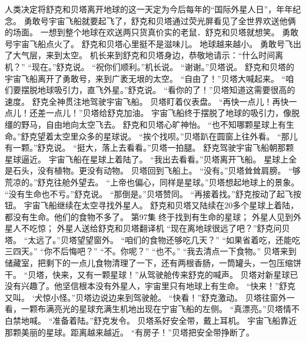 \documentclass[a4paper,12pt,UTF8,twoside]{ctexbook}
\begin{document}
        人类决定将舒克和贝塔离开地球的这一天定为今后每年的“国际外星人日”，年年纪念。 
        勇敢号宇宙飞船就要起飞了，舒克和贝塔通过荧光屏看见了全世界欢送他俩的场面。 
        一想到整个地球在欢送两只货真价实的老鼠．舒克和贝塔就想笑。 
        勇敢号宇宙飞船点火了。 
        舒克和贝塔心里挺不是滋味儿。 
        地球越来越小。 
        勇敢号飞出了大气层，来到太空。 
        机长来到舒克和贝塔身边，恭敬地请示：“什么时间离机？” 
        “现在。”舒克说。 
        “祝你们顺利。”机长说。 
        “谢谢。”贝塔说。 
        舒克和贝塔的宇宙飞船离开了勇敢号，来到广袤无垠的太空。 
       “自由了！”贝塔大喊起来。 
        “咱们要摆脱地球吸引力，直飞外星。”舒克说。 
        “看你的了！”贝塔知道这需要很高的速度。 
        舒克全神贯注地驾驶宇宙飞船。 
        贝塔盯着仪表盘。 
        “再快一点儿！再快一点儿！还差一点儿！”贝塔给舒克加油。 
        宇宙飞船终于摆脱了地球的吸引力，像脱缰的野马，自由地向太空飞去。 
        舒克和贝塔心旷神怡。 
        “也不知哪颗星球上有生命。”舒克望着太空里众多的星球说。 
        “挨个找呗。”贝塔趴在圆窗上往外看。 
        “那儿有一颗。”舒克说。 
        “挺大，落上去看看。”贝塔一拍腿。 
        舒克驾驶宇宙飞船朝那颗星球逼近。 
        宇宙飞船在星球上着陆了。 
        “我出去看看。”贝塔离开飞船。 
        星球上全是石头，没有植物。更没有动物。 
        贝塔回到飞船上。 
        “没有。”贝塔耸耸肩膀。 
        “够荒凉的。”舒克往舱外望去。 
        “上帝也偏心，同样是星球。”贝塔想起地球上的景象。 
        “没有生命也不亏。”舒克说。 
        “那倒是。”贝塔赞同。 
        “再接着找。”舒克按动了起飞按钮。 
        宇宙飞船继续在太空寻找外星人。 
        舒克和贝塔又陆续在20多个星球上着陆，都没有生命。他们的食物不多了。   第97集 
        终于找到有生命的星球； 
        外星人见到外星人不吃惊； 
        外星人送给舒克和贝塔翻译机   
        “现在离地球很远了吧？”舒克问贝塔。 
        “太远了。”贝塔望望窗外。 
        “咱们的食物还够吃几天？” 
        “如果省着吃，还能吃三四天。” 
        “你不后悔吧？” 
        “不。你呢？” 
        “也不。” 
        “我去清点一下食物。” 
        贝塔来到储藏室，把剩下的一点儿食物清理了一下，还有两根香肠，一筒罐头，一包压缩饼干。 
        “贝塔，快来，又有一颗星球！”从驾驶舱传来舒克的喊声。 
        贝塔对新星球已没有兴趣了。他坚信根本没有外星人，宇宙里只有地球上有生命。 
        “快来！”舒克又叫。 
        ‘犬惊小怪。”贝塔边说边来到驾驶舱。 
        “快看！”舒克激动。 
        贝塔往窗外一看，一颗布满亮光的星球充满生机地出现在宁宙飞船的左侧。 
        “真漂亮。”贝塔情不白禁地喊。 
        “准备着陆。”舒克发令。 
        贝塔系好安全带，戴上耳机。 
        宇宙飞船靠近那颗美丽的星球。距离越来越近。 
        “有房子！”贝塔把安全带挣断了。 
\end{document}
